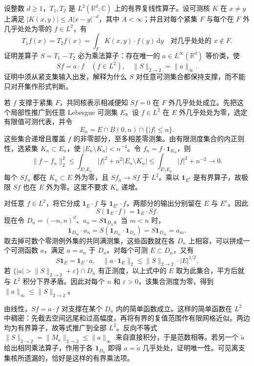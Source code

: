 \begin{exercise}\label{b2:ex:18-new-5}
设整数 \(d\geq1\)，\(T_1,T_2\) 是 \(L^2(\mathbb R^d;\mathbb C)\) 上的有界复线性算子。设可测核 \(K\) 在 \(x\ne y\) 上满足
\(|K(x,y)|\leq A|x-y|^{-d}\)，其中 \(A<\infty\)；并且对每个紧集 \(F\) 与每个在 \(F\) 外几乎处处为零的 \(f\in L^2\)，有
\[
 T_1f(x)=T_2f(x)=\int_FK(x,y)\cdot f(y)\,\mathrm dy
 \quad\text{对几乎处处的 }x\notin F.
\]
证明差算子 \(S=T_1-T_2\) 必为乘法算子：存在唯一的 \(a\in L^\infty(\mathbb R^d)\) 等价类，使
\[
 Sf=a\cdot f\quad(f\in L^2),
 \quad\|S\|_{2\to2}=\|a\|_\infty.
\]
证明中须从紧支集输入出发，解释为什么 \(S\) 对任意可测集合都保持支撑，而不能只对开集作形式判断。
\end{exercise}
\begin{solution}
若 \(f\) 支撑于紧集 \(F\)，共同核表示相减便知 \(Sf=0\) 在 \(F\) 外几乎处处成立。先把这个局部性推广到任意 Lebesgue 可测集 \(E\)。设 \(f\in L^2\) 在 \(E\) 外几乎处处为零，选定有限值可测代表，并令
\[
 E_n=E\cap B(0,n)\cap\{|f|\leq n\}.
\]
这些集合递增且覆盖 \(f\) 的非零部分，至多相差零测集。由有限测度集合的内正则性，选紧集 \(K_n\subset E_n\)，使
\(|E_n\setminus K_n|<n^{-4}\)。令 \(f_n=f\cdot\mathbf1_{K_n}\)，则
\[
 \|f-f_n\|_2^2
 \leq\int_{E\setminus E_n}|f|^2+n^2|E_n\setminus K_n|
 \leq\int_{E\setminus E_n}|f|^2+n^{-2}\longrightarrow0.
\]
每个 \(Sf_n\) 都在 \(K_n\subset E\) 外为零，且 \(Sf_n\to Sf\) 于 \(L^2\)。乘以 \(\mathbf1_{E^c}\) 是有界算子，故极限 \(Sf\) 也在 \(E\) 外为零。这里不要求 \(K_n\) 递增。

对任意 \(f\in L^2\)，将它分成 \(\mathbf1_E\cdot f\) 与 \(\mathbf1_{E^c}\cdot f\)，两部分的输出分别留在 \(E\) 与 \(E^c\)。因此
\[
 S(\mathbf1_E\cdot f)=\mathbf1_E\cdot Sf.
\]
现在令 \(D_n=(-n,n)^d\)、\(a_n=S\mathbf1_{D_n}\)。当 \(m<n\) 时，
\[
 \mathbf1_{D_m}\cdot a_n
 =S(\mathbf1_{D_m}\cdot\mathbf1_{D_n})
 =S\mathbf1_{D_m}=a_m.
\]
取去掉可数个零测例外集的共同满测集，这些函数就在各 \(D_n\) 上相容，可以拼成一个可测函数 \(a\)，满足 \(a=a_n\) 于 \(D_n\)。对每个可测 \(E\subset D_n\)，又有
\[
 S\mathbf1_E=\mathbf1_E\cdot a,
 \quad\|a\cdot\mathbf1_E\|_2
      \leq\|S\|_{2\to2}\cdot|E|^{1/2}.
\]
若 \(\{|a|>\|S\|_{2\to2}+\varepsilon\}\cap D_n\) 有正测度，以上式中的 \(E\) 取为此集合，平方后就与 \(L^2\) 积分下界矛盾。因此对每个 \(n\) 和 \(\varepsilon>0\)，该集合测度为零，得到 \(\|a\|_\infty\leq\|S\|_{2\to2}\)。

由线性，\(Sf=a\cdot f\) 对支撑在某个 \(D_n\) 内的简单函数成立。这样的简单函数在 \(L^2\) 中稠密：先截去空间远尾和过高幅度，再将有界的复值范围作有限网格近似。两边均为有界算子，故等式推广到全部 \(L^2\)。反向不等式
\(\|S\|_{2\to2}=\|M_a\|_{2\to2}\leq\|a\|_\infty\)
来自直接积分，于是范数相等。若另一个 \(\widetilde a\) 给出相同乘法算子，作用于各 \(\mathbf1_{D_n}\) 即得 \(a=\widetilde a\) 几乎处处，证明唯一性。可见离支集核所遗漏的，恰好是这样的有界乘法项。
\end{solution}

